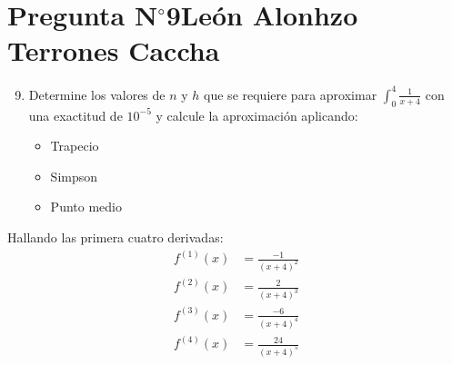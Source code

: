 \section{Pregunta N$^{\circ}$9\qquad León Alonhzo Terrones Caccha}

\begin{frame}
    \begin{enumerate}\setcounter{enumi}{8}
        \item

              Determine los valores de $n$ y $h$ que se requiere para
              aproximar $\int_{0}^{4}\frac{1}{x+4}$ con una exactitud
              de $10^{-5}$ y calcule la aproximación aplicando:

              \begin{itemize}
                  \item

                        Trapecio

                  \item

                        Simpson

                  \item

                        Punto medio
              \end{itemize}
    \end{enumerate}

    \begin{solution}
        Hallando las primera cuatro derivadas:
        \begin{align*}
            f^{(1)}(x) & =\frac{-1}{(x+4)^2} \\
            f^{(2)}(x) & =\frac{2}{(x+4)^3}  \\
            f^{(3)}(x) & =\frac{-6}{(x+4)^4} \\
            f^{(4)}(x) & =\frac{24}{(x+4)^5}
        \end{align*}
    \end{solution}
\end{frame}

